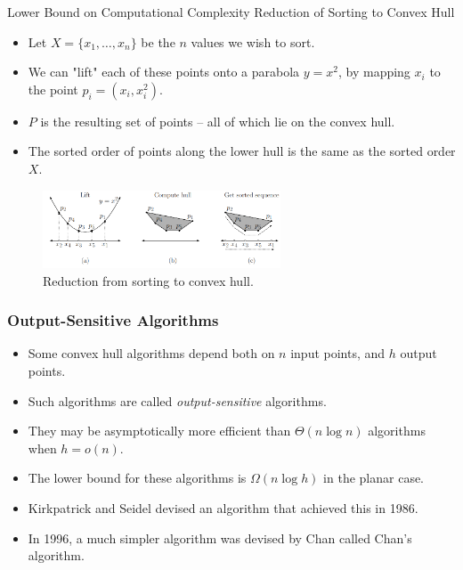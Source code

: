 \documentclass{beamer}
\begin{document}
    \begin{frame}[t]{Lower Bound on Computational Complexity}
    {Reduction of Sorting to Convex Hull}
\begin{itemize}
    \item Let $X = \{x_1, \dots, x_n\}$ be the $n$ values we wish to sort.
    \item We can "lift" each of these points onto a parabola $y=x^2$, by mapping $x_i$ to the point 
    $p_i=(x_i,x_i^2)$.
    \item $P$ is the resulting set of points -- all of which lie on the convex hull.
    \item The sorted order of points along the lower hull is the same as the sorted order $X$.
    \end{itemize}    
   \begin{figure}
       \centering
       \includegraphics[width=0.63\textwidth]{lowerbound.png}
       \vspace{-0.75 em}
       \caption{Reduction from sorting to convex hull.}
   \end{figure}
    \end{frame}

    \begin{frame}
      \frametitle{Output-Sensitive Algorithms}
      \begin{itemize}
          \item Some convex hull algorithms depend both on $n$ input points, 
          and $h$ output points. 
          \item Such algorithms are called \textit{output-sensitive} algorithms.
          \item They may be asymptotically more efficient than $\Theta(n\log n)$ algorithms when $h = o(n)$.
          \item The lower bound for these algorithms is $\Omega(n \log h)$ in the planar case. 
          \item Kirkpatrick and Seidel devised an algorithm that achieved this in 1986.
          \item In 1996, a much simpler algorithm was devised by Chan called Chan's algorithm.
      \end{itemize}
    \end{frame}
\end{document}
